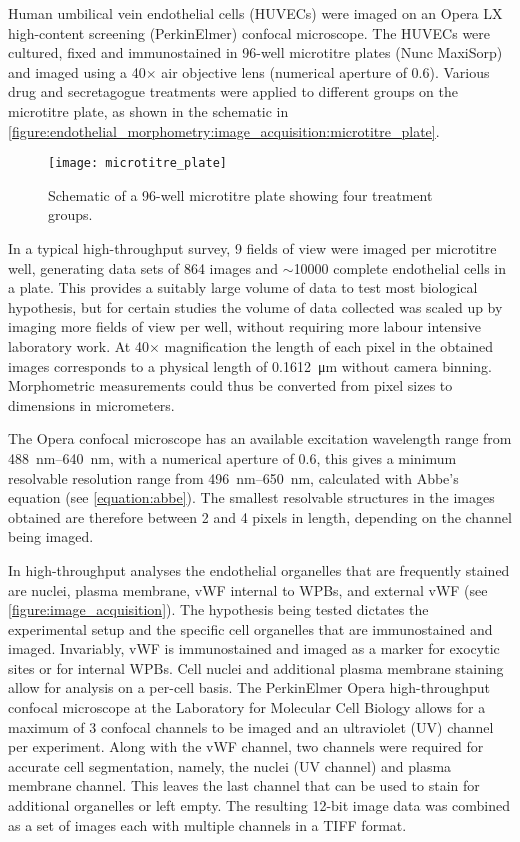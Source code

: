 Human umbilical vein endothelial cells (HUVECs) were imaged on an Opera LX high-content screening (PerkinElmer) confocal microscope. The HUVECs were cultured, fixed and immunostained in 96-well microtitre plates  (Nunc MaxiSorp) and imaged using a 40$\times$ air objective lens (numerical aperture of 0.6). Various drug and secretagogue treatments were applied to different groups on the microtitre plate, as shown in the schematic in \autoref{figure:endothelial_morphometry:image_acquisition:microtitre_plate}.

\begin{figure}[htbp!]
	\centering
	\texttt{[image: microtitre\_plate]}
	\caption[Microtitre plate layout]{Schematic of a 96-well microtitre plate showing four treatment groups.}
	\label{figure:endothelial_morphometry:image_acquisition:microtitre_plate}
\end{figure}

In a typical high-throughput survey, 9 fields of view were imaged per microtitre well, generating data sets of 864 images and $\sim$10000 complete endothelial cells in a plate. This provides a suitably large volume of data to test most biological hypothesis, but for certain studies the volume of data collected was scaled up by imaging more fields of view per well, without requiring more labour intensive laboratory work. At 40$\times$ magnification the length of each pixel in the obtained images corresponds to a physical length of \SI{0.1612}{\micro\meter} without camera binning. Morphometric measurements could thus be converted from pixel sizes to dimensions in micrometers.

The Opera confocal microscope has an available excitation wavelength range from \SIrange{488}{640}{\nano\meter}, with a numerical aperture of 0.6, this gives a minimum resolvable resolution range from \SIrange{496}{650}{\nano\meter}, calculated with Abbe's equation (see \autoref{equation:abbe}). The smallest resolvable structures in the images obtained are therefore between 2 and 4 pixels in length, depending on the channel being imaged.

In high-throughput analyses the endothelial organelles that are frequently stained are nuclei, plasma membrane, vWF internal to WPBs, and external vWF (see \autoref{figure:image_acquisition}). The hypothesis being tested dictates the experimental setup and the specific cell organelles that are immunostained and imaged. Invariably, vWF is immunostained and imaged as a marker for exocytic sites or for internal WPBs. Cell nuclei and additional plasma membrane staining allow for analysis on a per-cell basis. The PerkinElmer Opera high-throughput confocal microscope at the Laboratory for Molecular Cell Biology allows for a maximum of 3 confocal channels to be imaged and an ultraviolet (UV) channel per experiment. Along with the vWF channel, two channels were required for accurate cell segmentation, namely, the nuclei (UV channel) and plasma membrane channel. This leaves the last channel that can be used to stain for additional organelles or left empty. The resulting 12-bit image data was combined as a set of images each with multiple channels in a TIFF format.

